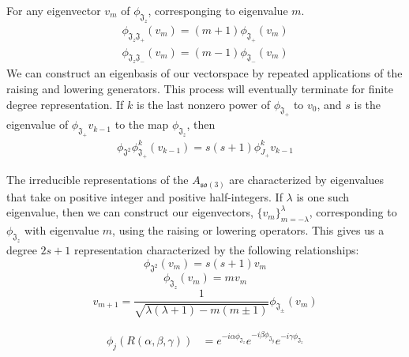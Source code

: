\documentclass[compress,aspectratio=169,10pt,usenames,dvipsnames]{beamer}
\begin{document}
\begin{frame}
\vfill 
For any eigenvector $v_m$ of $\phi_{\mathfrak{J}_z}$, corresponging to eigenvalue $m$.
\begin{equation}
	\begin{aligned}
		\phi_{\mathfrak{J}_z\mathfrak{J}_+}(v_m) = (m + 1)\phi_{\mathfrak{J}_+}(v_m)
	\end{aligned}
\end{equation} 
\begin{equation}
	\begin{aligned}
		\phi_{\mathfrak{J}_z\mathfrak{J}_-}(v_m) = (m -1)\phi_{\mathfrak{J}_-}(v_m)
	\end{aligned}
\end{equation} 
\vfill
We can construct an eigenbasis of our vectorspace by repeated applications of the raising and lowering generators.
\vfill
This process will eventually terminate for finite degree representation.
\vfill
If $k$ is the last nonzero power of $\phi_{\mathfrak{J}_+}$ to $v_0$, and $s$ is the eigenvalue of $\phi_{\mathfrak{J}_+}v_{k-1}$ to the map $\phi_{\mathfrak{J}_z}$, then
\begin{equation}
	\begin{aligned}
		\phi_{\mathfrak{J^2}}\phi_{\mathfrak{J}_+}^k(v_{k-1})= s(s + 1) \phi_{J_+}^kv_{k-1}
	\end{aligned}
\end{equation}
\vfill
\end{frame}
%
%
\begin{frame}
\vfill
\begin{theorem}
	The irreducible representations of the $A_{\mathfrak{so}(3)}$ are characterized by eigenvalues that take on positive integer and positive half-integers. If $\lambda$ is one such eigenvalue, then we can construct our eigenvectors, $\{v_m\}_{m=-\lambda}^\lambda$, corresponding to $\phi_{\mathfrak{J}_z}$ with eigenvalue $m$, using the raising or lowering operators. This gives us a degree $2s +1$ representation characterized by the following relationships:
$$\phi_{\mathfrak{J}^2}(v_m) = s(s+1)v_m$$
$$\phi_{\mathfrak{J}_z}(v_m) =  mv_m$$ 
$$v_{m+1} =  \frac{1}{\sqrt{\lambda(\lambda+1) - m(m\pm 1)}}\phi_{\mathfrak{J}_\pm}(v_m)$$
\end{theorem}
\vfill
\begin{equation}
\begin{aligned}
	\phi_j(R(\alpha,\beta,\gamma)) &= e^{-i\alpha\phi_{\mathfrak{J}_z}}e^{-i\beta\phi_{\mathfrak{J}_y}}e^{-i\gamma\phi_{\mathfrak{J}_z}}	
\end{aligned}
\end{equation}
\vfill
\end{frame}
\end{document}
